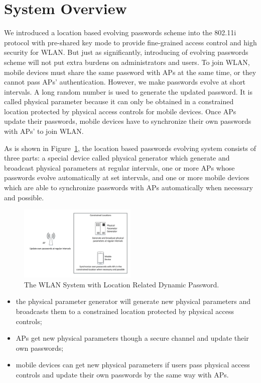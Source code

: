 \section{System Overview}
\label{sec:systemoverview}
We introduced a location based evolving passwords scheme into the 802.11i protocol with pre-shared key mode to provide fine-grained access control and high security for WLAN. But just as significantly, introducing of evolving passwords scheme will not put extra burdens on administrators and users. To join WLAN, mobile devices must share the same password with APs at the same time, or they cannot pass APs’ authentication. However, we make passwords evolve at short intervals. A long random number is used to generate the updated password. It is called physical parameter because it can only be obtained in a constrained location protected by physical access controls for mobile devices. Once APs update their passwords, mobile devices have to  synchronize their own passwords with APs’ to join WLAN.


As is shown in Figure~\ref{fig:Overview of the WLAN System with Location Related Dynamic Password}, the location based passwords evolving system consists of three parts: a special device called physical generator which generate and broadcast physical parameters at regular intervals, one or more APs whose passwords evolve automatically at set intervals, and one or more mobile devices which are able to synchronize passwords with APs automatically when necessary and possible. 

\begin{figure}
    \centering
    \includegraphics[width=0.5\textwidth]{pic/1.pdf}
    \caption{The WLAN System with Location Related Dynamic Password.}
    \label{fig:Overview of the WLAN System with Location Related Dynamic Password}
\end{figure}

 
\begin{itemize}
    \item the physical parameter generator will generate new physical parameters and broadcasts them to a constrained location protected by physical access controls; 
    \item APs get new physical parameters though a secure channel and update their own passwords; 
    \item  mobile devices can get new physical parameters if users pass physical access controls and update their own passwords by the same way with APs. 
\end{itemize}
	
